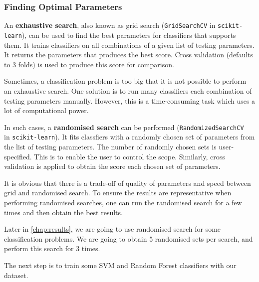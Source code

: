 \subsubsection{Finding Optimal Parameters}
An \textbf{exhaustive search}, also known as grid search (\texttt{GridSearchCV} in \texttt{scikit-learn}), can be used to find the best parameters for classifiers that supports them. It trains classifiers on all combinations of a given list of testing parameters. It returns the parameters that produces the best score. Cross validation (defaults to 3 folds) is used to produce this score for comparison. 

Sometimes, a classification problem is too big that it is not possible to perform an exhaustive search. One solution is to run many classifiers each combination of testing parameters manually. However, this is a time-consuming task which uses a lot of computational power. 

In such cases, a \textbf{randomised search} can be performed (\texttt{RandomizedSearchCV} \\in \texttt{scikit-learn}). It fits classfiers with a randomly chosen set of parameters from the list of testing parameters. The number of randomly chosen sets is user-specified. This is to enable the user to control the scope. Similarly, cross validation is applied to obtain the score each chosen set of parameters.

It is obvious that there is a trade-off of quality of parameters and speed between grid and randomised search. To ensure the results are representative when performing randomised searches, one can run the randomised search for a few times and then obtain the best results.

Later in \autoref{chap:results}, we are going to use randomised search for some classification problems. We are going to obtain 5 randomised sets per search, and perform this search for 3 times.


The next step is to train some SVM and Random Forest classifiers with our dataset. 
